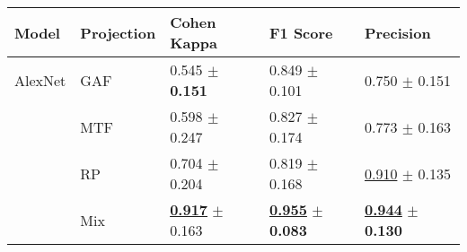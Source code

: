 
\begin{tabular}[t]{lllll}
\toprule
Model & Projection & Cohen Kappa & F1 Score & Precision \\
\midrule
AlexNet & GAF & \textcolor[rgb]{1.0000000000,0.0000000000,0}{0.545} $\pm$ \textbf{\textcolor[rgb]{0.0000000000,0.5000000000,0}{0.151}} & \textcolor[rgb]{0.7777777778,0.2222222222,0}{0.849} $\pm$ \textcolor[rgb]{0.1993959038,0.5000000000,0}{0.101} & \textcolor[rgb]{1.0000000000,0.0000000000,0}{0.750} $\pm$ \textcolor[rgb]{0.6349071673,0.3650928327,0}{0.151} \\
 & MTF & \textcolor[rgb]{0.8571428571,0.1428571429,0}{0.598} $\pm$ \textcolor[rgb]{1.0000000000,0.0000000000,0}{0.247} & \textcolor[rgb]{0.9425837321,0.0574162679,0}{0.827} $\pm$ \textcolor[rgb]{1.0000000000,0.0000000000,0}{0.174} & \textcolor[rgb]{0.8831168831,0.1168831169,0}{0.773} $\pm$ \textcolor[rgb]{1.0000000000,0.0000000000,0}{0.163} \\
 & RP & \textcolor[rgb]{0.5724489796,0.4275510204,0}{0.704} $\pm$ \textcolor[rgb]{0.5538521086,0.4461478914,0}{0.204} & \textcolor[rgb]{1.0000000000,0.0000000000,0}{0.819} $\pm$ \textcolor[rgb]{0.9283513413,0.0716486587,0}{0.168} & \underline{\textcolor[rgb]{0.1785714286,0.5000000000,0}{0.910}} $\pm$ \textcolor[rgb]{0.1620976255,0.5000000000,0}{0.135} \\
 & Mix & \underline{\textbf{\textcolor[rgb]{0.0000000000,0.5000000000,0}{0.917}}} $\pm$ \textcolor[rgb]{0.1259027269,0.5000000000,0}{0.163} & \underline{\textbf{\textcolor[rgb]{0.0000000000,0.5000000000,0}{0.955}}} $\pm$ \textbf{\textcolor[rgb]{0.0000000000,0.5000000000,0}{0.083}} & \underline{\textbf{\textcolor[rgb]{0.0000000000,0.5000000000,0}{0.944}}} $\pm$ \textbf{\textcolor[rgb]{0.0000000000,0.5000000000,0}{0.130}} \\
\bottomrule
\end{tabular}

